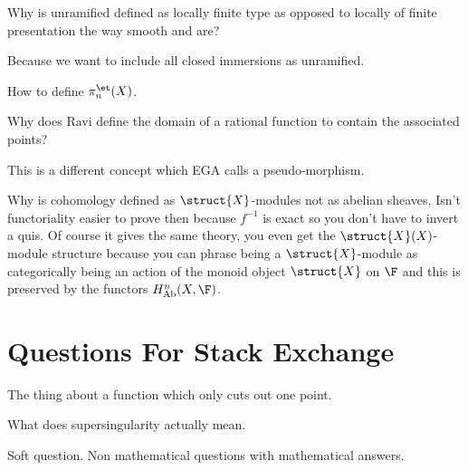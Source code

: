 \documentclass[12pt]{article}
\begin{document}
\begin{exercise}
Why is unramified defined as locally finite type as opposed to locally of finite presentation the way smooth and \etale are?
\end{exercise}

Because we want to include all closed immersions as unramified. 

\begin{exercise}
How to define $\pi_n^{\et}(X)$.
\end{exercise}

\begin{exercise}
Why does Ravi define the domain of a rational function to contain the associated points?
\end{exercise}

This is a different concept which EGA calls a pseudo-morphism.

\begin{exercise}
Why is cohomology defined as $\struct{X}$-modules not as abelian sheaves, Isn't functoriality easier to prove then because $f^{-1}$ is exact so you don't have to invert a quis. Of course it gives the same theory, you even get the $\struct{X}(X)$-module structure because you can phrase being a $\struct{X}$-module as categorically being an action of the monoid object $\struct{X}$ on $\F$ and this is preserved by the functors $H^n_{\mathrm{Ab}}(X, \F)$.
\end{exercise}

\section{Questions For Stack Exchange}

\begin{exercise}
The thing about a function which only cuts out one point.
\end{exercise}

\begin{exercise}
What does supersingularity actually mean.
\end{exercise}

\begin{exercise}
Soft question. Non mathematical questions with mathematical answers. 
\end{exercise}
\end{document}
